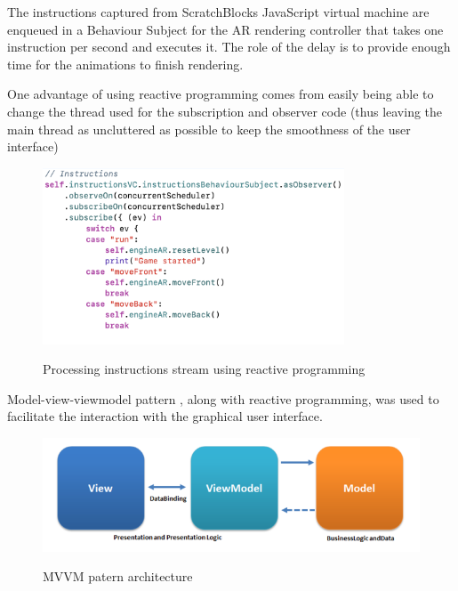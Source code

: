 \documentclass[12 pct]{report}
\begin{document}
The instructions captured from ScratchBlocks JavaScript virtual machine are enqueued in a Behaviour Subject for the AR rendering controller that takes one instruction per second and executes it. The role of the delay is to provide enough time for the animations to finish rendering. 

One advantage of using reactive programming comes from easily being able to change the thread used for the subscription and observer code (thus leaving the main thread as uncluttered as possible to keep the smoothness of the user interface)
\begin{figure}[H]
\includegraphics[width=0.8\textwidth]{reactive-instructions}
\centering
\label{fig:reactive-repository}
\caption{Processing instructions stream using reactive programming}
\end{figure}

Model-view-viewmodel pattern \cite{anderson2012model}, along with reactive programming, was used to facilitate the interaction with the graphical user interface.

\begin{figure}[H]
\includegraphics[width=1.0\textwidth]{mvvm}
\centering
\label{fig:reactive-repository}
\caption{MVVM patern architecture }
\end{figure}
\end{document}
